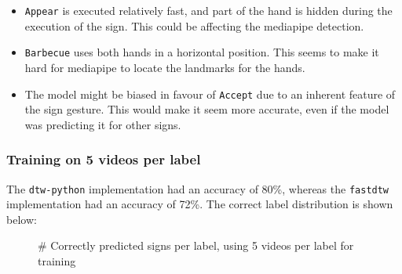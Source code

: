 \documentclass[final,rdr32.tex]{subfiles}
\begin{document}
\begin{itemize}
    \item \verb|Appear| is executed relatively fast, and part of the hand is hidden during the execution of the sign. This could be affecting the mediapipe detection.
    \item \verb|Barbecue| uses both hands in a horizontal position. This seems to make it hard for mediapipe to locate the landmarks for the hands.
    \item The model might be biased in favour of \verb|Accept| due to an inherent feature of the sign gesture. This would make it seem more accurate, even if the model was predicting it for other signs.
\end{itemize}



\subsubsection{Training on 5 videos per label}
\label{sec:fivevid}

The \verb|dtw-python| implementation had an accuracy of 80\%, whereas the \verb|fastdtw| implementation had an accuracy of 72\%. The correct label distribution is shown below:
\begin{figure}[H]
    \begin{center}
    \end{center}
    \caption{\# Correctly predicted signs per label, using 5 videos per label for training}
    \label{bar:two}
\end{figure}
\end{document}
